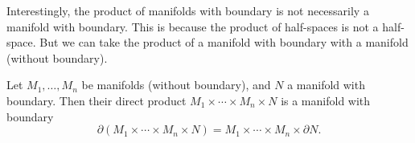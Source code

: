 \enote

Interestingly, the product of manifolds with boundary is not necessarily a manifold with boundary.
This is because the product of half-spaces is not a half-space.
But we can take the product of a manifold with boundary with a manifold (without boundary).

\bprop

    Let $M_1,\dots,M_n$ be manifolds (without boundary), and $N$ a manifold with boundary.
    Then their direct product $M_1\times\cdots\times M_n\times N$ is a manifold with boundary
    $$ \partial(M_1\times\cdots\times M_n\times N) = M_1\times\cdots\times M_n\times\partial N . $$

\eprop

